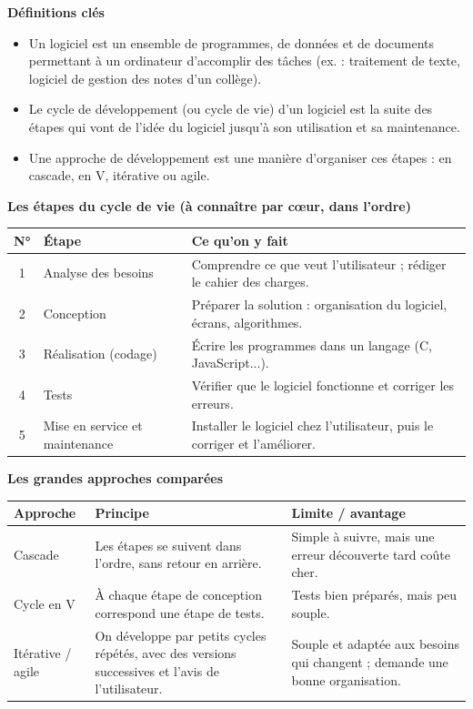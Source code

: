 \documentclass[11pt]{article}
\newcommand{\cle}[1]{{\popxbold\color{popdark}#1}}
\begin{document}
\begin{bilan}
\textbf{Définitions clés}
\begin{itemize}
  \item Un \cle{logiciel} est un ensemble de programmes, de données et de documents permettant à un ordinateur d'accomplir des tâches (ex. : traitement de texte, logiciel de gestion des notes d'un collège).
  \item Le \cle{cycle de développement} (ou cycle de vie) d'un logiciel est la suite des étapes qui vont de l'idée du logiciel jusqu'à son utilisation et sa maintenance.
  \item Une \cle{approche de développement} est une manière d'organiser ces étapes : en cascade, en V, itérative ou agile.
\end{itemize}

\textbf{Les étapes du cycle de vie (à connaître par c\oe ur, dans l'ordre)}
\begin{center}
\begin{tabularx}{\linewidth}{|c|l|X|}
\hline
\rowcolor{popblueL} \textbf{N°} & \textbf{Étape} & \textbf{Ce qu'on y fait} \\
\hline
1 & Analyse des besoins & Comprendre ce que veut l'utilisateur ; rédiger le cahier des charges. \\
\hline
2 & Conception & Préparer la solution : organisation du logiciel, écrans, algorithmes. \\
\hline
3 & Réalisation (codage) & Écrire les programmes dans un langage (C, JavaScript...). \\
\hline
4 & Tests & Vérifier que le logiciel fonctionne et corriger les erreurs. \\
\hline
5 & Mise en service et maintenance & Installer le logiciel chez l'utilisateur, puis le corriger et l'améliorer. \\
\hline
\end{tabularx}
\end{center}

\textbf{Les grandes approches comparées}
\begin{center}
\begin{tabularx}{\linewidth}{|l|X|X|}
\hline
\rowcolor{popblueL} \textbf{Approche} & \textbf{Principe} & \textbf{Limite / avantage} \\
\hline
Cascade & Les étapes se suivent dans l'ordre, sans retour en arrière. & Simple à suivre, mais une erreur découverte tard coûte cher. \\
\hline
Cycle en V & À chaque étape de conception correspond une étape de tests. & Tests bien préparés, mais peu souple. \\
\hline
Itérative / agile & On développe par petits cycles répétés, avec des versions successives et l'avis de l'utilisateur. & Souple et adaptée aux besoins qui changent ; demande une bonne organisation. \\
\hline
\end{tabularx}
\end{center}


\end{bilan}
\end{document}
